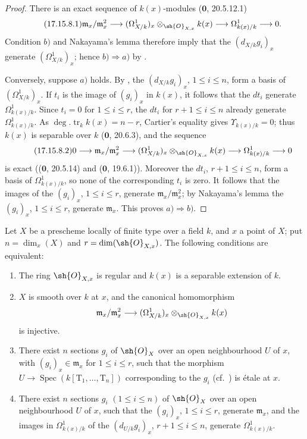 \begin{proof}
There is an exact sequence of $k(x)$-modules ($\mathbf{0}$, 20.5.12.1)
\[
\label{IV.17.15.8.1}
\tag{17.15.8.1}
 \mathfrak m_x/\mathfrak m_x^2
 \longrightarrow (\Omega^1_{X/k})_x\otimes_{\sh{O}_{X,x}}k(x)
 \longrightarrow \Omega^1_{k(x)/k}\longrightarrow0.
\]
Condition $b)$ and Nakayama's lemma therefore imply that the $(d_{X/k}g_i)_x$ generate $(\Omega^1_{X/k})_x$; hence $b)\Rightarrow a)$ by .

Conversely, suppose $a)$ holds.  By , the $(d_{X/k}g_i)_x$, $1\leq i\leq n$, form a basis of $(\Omega^1_{X/k})_x$.  If $t_i$ is the image of $(g_i)_x$ in $k(x)$, it follows that the $dt_i$ generate $\Omega^1_{k(x)/k}$.  Since $t_i=0$ for $1\leq i\leq r$, the $dt_i$ for $r+1\leq i\leq n$ already generate $\Omega^1_{k(x)/k}$.  As $\deg.\operatorname{tr}_k k(x)=n-r$, Cartier's equality gives $\Upsilon_{k(x)/k}=0$; thus $k(x)$ is separable over $k$ ($\mathbf{0}$, 20.6.3), and the sequence
\[
\label{IV.17.15.8.2}
\tag{17.15.8.2}
 0\longrightarrow\mathfrak m_x/\mathfrak m_x^2
 \longrightarrow(\Omega^1_{X/k})_x\otimes_{\sh{O}_{X,x}}k(x)
 \longrightarrow\Omega^1_{k(x)/k}\longrightarrow0
\]
is exact (($\mathbf{0}$, 20.5.14) and ($\mathbf{0}$, 19.6.1)).  Moreover the $dt_i$, $r+1\leq i\leq n$, form a basis of $\Omega^1_{k(x)/k}$, so none of the corresponding $t_i$ is zero.  It follows that the images of the $(g_i)_x$, $1\leq i\leq r$, generate $\mathfrak m_x/\mathfrak m_x^2$; by Nakayama's lemma the $(g_i)_x$, $1\leq i\leq r$, generate $\mathfrak m_x$.  This proves $a)\Rightarrow b)$.
\end{proof}

\begin{corollary}[17.15.9]
\label{IV.17.15.9}
Let $X$ be a prescheme locally of finite type over a field $k$, and $x$ a point of $X$; put $n=\dim_x(X)$ and $r=\dim(\sh{O}_{X,x})$.
The following conditions are equivalent:
\begin{enumerate}
  \item[a)] The ring $\sh{O}_{X,x}$ is regular and $k(x)$ is a separable extension of $k$.
  \item[b)] $X$ is smooth over $k$ at $x$, and the canonical homomorphism
\[
\mathfrak m_x/\mathfrak m_x^2 \longrightarrow (\Omega^1_{X/k})_x\otimes_{\sh{O}_{X,x}} k(x)
\]
is injective.
  \item[c)] There exist $n$ sections $g_i$ of $\sh{O}_X$ over an open neighbourhood $U$ of $x$, with $(g_i)_x\in\mathfrak m_x$ for $1\leq i\leq r$, such that the morphism $U\to\operatorname{Spec}(k[\mathrm{T}_1,\ldots,\mathrm{T}_n])$ corresponding to the $g_i$ (cf.\ ) is \'etale at $x$.
  \item[d)] There exist $n$ sections $g_i$ $(1\leq i\leq n)$ of $\sh{O}_X$ over an open neighbourhood $U$ of $x$, such that the $(g_i)_x$, $1\leq i\leq r$, generate $\mathfrak m_x$, and the images in $\Omega^1_{k(x)/k}$ of the $(d_{U/k}g_i)_x$, $r+1\leq i\leq n$, generate $\Omega^1_{k(x)/k}$.
\end{enumerate}
\end{corollary}

